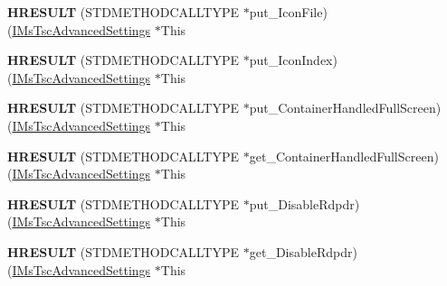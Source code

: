 \begin{DoxyCompactItemize}
\item 
\mbox{\label{struct_m_s_t_s_c_lib_1_1_i_ms_tsc_advanced_settings_vtbl_afce57504489101e54803cf18b3394675}} 
{\bfseries H\+R\+E\+S\+U\+LT} (S\+T\+D\+M\+E\+T\+H\+O\+D\+C\+A\+L\+L\+T\+Y\+PE $\ast$put\+\_\+\+Icon\+File)(\hyperlink{interface_m_s_t_s_c_lib_1_1_i_ms_tsc_advanced_settings}{I\+Ms\+Tsc\+Advanced\+Settings} $\ast$This
\item 
\mbox{\label{struct_m_s_t_s_c_lib_1_1_i_ms_tsc_advanced_settings_vtbl_a06465f2d91b905a48857280c904d1e76}} 
{\bfseries H\+R\+E\+S\+U\+LT} (S\+T\+D\+M\+E\+T\+H\+O\+D\+C\+A\+L\+L\+T\+Y\+PE $\ast$put\+\_\+\+Icon\+Index)(\hyperlink{interface_m_s_t_s_c_lib_1_1_i_ms_tsc_advanced_settings}{I\+Ms\+Tsc\+Advanced\+Settings} $\ast$This
\item 
\mbox{\label{struct_m_s_t_s_c_lib_1_1_i_ms_tsc_advanced_settings_vtbl_aedf9fb4d2eff395fc7193b9f26af4ca4}} 
{\bfseries H\+R\+E\+S\+U\+LT} (S\+T\+D\+M\+E\+T\+H\+O\+D\+C\+A\+L\+L\+T\+Y\+PE $\ast$put\+\_\+\+Container\+Handled\+Full\+Screen)(\hyperlink{interface_m_s_t_s_c_lib_1_1_i_ms_tsc_advanced_settings}{I\+Ms\+Tsc\+Advanced\+Settings} $\ast$This
\item 
\mbox{\label{struct_m_s_t_s_c_lib_1_1_i_ms_tsc_advanced_settings_vtbl_a65fed52f6aeb8ef8eef02969c432e9d0}} 
{\bfseries H\+R\+E\+S\+U\+LT} (S\+T\+D\+M\+E\+T\+H\+O\+D\+C\+A\+L\+L\+T\+Y\+PE $\ast$get\+\_\+\+Container\+Handled\+Full\+Screen)(\hyperlink{interface_m_s_t_s_c_lib_1_1_i_ms_tsc_advanced_settings}{I\+Ms\+Tsc\+Advanced\+Settings} $\ast$This
\item 
\mbox{\label{struct_m_s_t_s_c_lib_1_1_i_ms_tsc_advanced_settings_vtbl_a6639c141f9c26cbb72e858f499c66c79}} 
{\bfseries H\+R\+E\+S\+U\+LT} (S\+T\+D\+M\+E\+T\+H\+O\+D\+C\+A\+L\+L\+T\+Y\+PE $\ast$put\+\_\+\+Disable\+Rdpdr)(\hyperlink{interface_m_s_t_s_c_lib_1_1_i_ms_tsc_advanced_settings}{I\+Ms\+Tsc\+Advanced\+Settings} $\ast$This
\item 
\mbox{\label{struct_m_s_t_s_c_lib_1_1_i_ms_tsc_advanced_settings_vtbl_a8bb430be7b3d464e05bae2ed164149bb}} 
{\bfseries H\+R\+E\+S\+U\+LT} (S\+T\+D\+M\+E\+T\+H\+O\+D\+C\+A\+L\+L\+T\+Y\+PE $\ast$get\+\_\+\+Disable\+Rdpdr)(\hyperlink{interface_m_s_t_s_c_lib_1_1_i_ms_tsc_advanced_settings}{I\+Ms\+Tsc\+Advanced\+Settings} $\ast$This
\end{DoxyCompactItemize}
